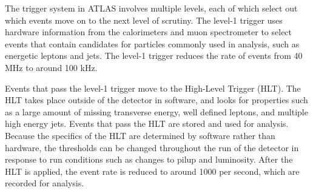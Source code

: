 The trigger system in ATLAS involves multiple levels, each of which select out which events move on to the next level of scrutiny. The level-1 trigger uses hardware information from the calorimeters and muon spectrometer to select events that contain candidates for particles commonly used in analysis, such as energetic leptons and jets. The level-1 trigger reduces the rate of events from 40 MHz to around 100 kHz. 

Events that pass the level-1 trigger move to the High-Level Trigger (HLT). The HLT takes place outside of the detector in software, and looks for properties such as a large amount of missing transverse energy, well defined leptons, and multiple high energy jets. Events that pass the HLT are stored and used for analysis. Because the specifics of the HLT are determined by software rather than hardware, the thresholds can be changed throughout the run of the detector in response to run conditions such as changes to pilup and luminosity. After the HLT is applied, the event rate is reduced to around 1000 per second, which are recorded for analysis.
